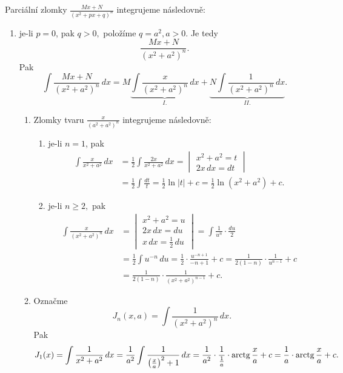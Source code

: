 \begin{pozn}
Parciální zlomky $\frac{Mx+N}{(x^2+px+q)^n}$ integrujeme následovně:
\begin{enumerate}[1.]
    \item je-li $p=0$, pak $q>0,$ položíme $q=a^2,a>0$. Je tedy
    $$\frac{Mx+N}{(x^2+a^2)^n}.$$
    Pak
    $$\int \frac{Mx+N}{(x^2+a^2)^n}\, dx = M\underbrace{\int \frac{x}{(x^2+a^2)^n}\, dx}_{I.} + \underbrace{N\int \frac{1}{(x^2+a^2)^n}\, dx}_{II.}.$$
    \begin{enumerate}[$I.$]
    \item Zlomky tvaru $\frac{x}{(a^2+a^2)^n}$ integrujeme následovně:
    \begin{enumerate}[$i.$]
    \item je-li $n=1$, pak
    \begin{align*}
        \int \frac{x}{x^2+a^2}\, dx &= \frac{1}{2}\int \frac{2x}{x^2+a^2}\, dx = \begin{vmatrix}
            x^2+a^2=t \\
            2x\, dx = dt
        \end{vmatrix} \\
        &=\frac{1}{2} \int \frac{dt}{t}=\frac{1}{2}\ln |t|+c=\frac{1}{2}\ln(x^2+a^2)+c.
    \end{align*}
   	\item je-li $n \geq 2,$ pak
    \begin{align*}
        \int \frac{x}{(x^2+a^2)^n}\, dx &= \begin{vmatrix}
            x^2+a^2=u \\
            2x\, dx = du \\
            x\, dx = \frac{1}{2}\, du
        \end{vmatrix}=\int \frac{1}{u^n}\cdot \frac{du}{2} \\
        &= \frac{1}{2}\int u^{-n}\, du = \frac{1}{2}\cdot \frac{u^{-n+1}}{-n+1}+c =\frac{1}{2(1-n)}\cdot \frac{1}{u^{n-1}}+c \\
        & = \frac{1}{2(1-n) }\cdot\frac{1}{(x^2+a^2)^{n-1}}+c.
    \end{align*}
    \end{enumerate}
   	\item Označme
    $$J_n(x,a)=\int \frac{1}{(x^2+a^2)^n}\, dx.$$ Pak
    $$
        J_1(x)= \int \frac{1}{x^2+a^2} \, dx = \frac{1}{a^2}\int \frac{1}{\left ( \frac{x}{a} \right )^2+1 }\, dx =\frac{1}{a^2}\cdot \frac{1}{\frac{1}{a}}\cdot \operatorname{arctg} \frac{x}{a} + c = \frac{1}{a}\cdot \operatorname{arctg} \frac{x}{a}+c.
$$
\end{enumerate}
\end{enumerate}
\end{pozn}
